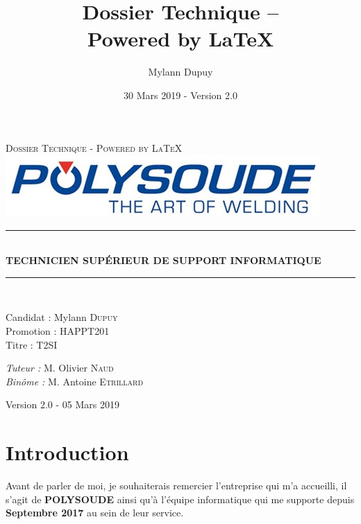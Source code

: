 \documentclass[11pt,a4paper,twoside]{article}
\author{Mylann Dupuy}
\title{Dossier Technique --  \\ Powered by \LaTeX}
\date{30 Mars 2019 - Version 2.0}
\newcommand{\HRule}{\rule{\linewidth}{0.5mm}}
\begin{document}
\begin{titlepage}
  \begin{sffamily}
  \begin{center}

    \textsc{\LARGE Dossier Technique - Powered by \LaTeX}\\[6.5cm]
    \includegraphics[scale=1]{Ressources/polysoude.jpg}
        \HRule \\[0.4cm]
        { \huge \bfseries TECHNICIEN SUPÉRIEUR DE SUPPORT INFORMATIQUE\\[0.4cm] }

        \HRule \\[6.5cm]

    \begin{minipage}{0.4\textwidth}
      \begin{flushleft} \large
        Candidat : Mylann \textsc{Dupuy}\\
        Promotion : HAPPT201\\
        Titre : T2SI
      \end{flushleft}
    \end{minipage}
    \begin{minipage}{0.5\textwidth}
      \begin{flushright} \large
        \emph{Tuteur :} M. Olivier \textsc{Naud}\\
        \emph{Binôme :} M. Antoine \textsc{Etrillard}\\
      \end{flushright}
    \end{minipage}

    \vfill

    {\large Version 2.0 - 05 Mars 2019}

  \end{center}
  \end{sffamily}
\end{titlepage}
\newpage

\tableofcontents
\newpage
\newpage

\section{Introduction}
Avant de parler de moi, je souhaiterais remercier l'entreprise qui m'a accueilli, il s'agit de \textbf{POLYSOUDE} ainsi qu'à l'équipe informatique qui me supporte depuis \textbf{Septembre 2017} au sein de leur service.
\end{document}
